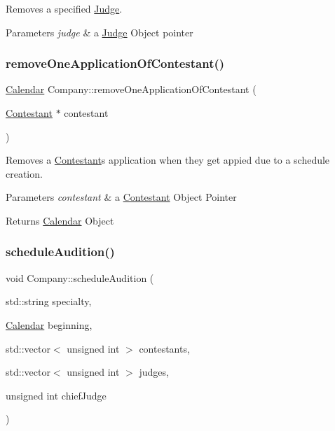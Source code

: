 Removes a specified \hyperlink{class_judge}{Judge}. 


\begin{DoxyParams}{Parameters}
{\em judge} & a \hyperlink{class_judge}{Judge} Object pointer \\
\hline
\end{DoxyParams}
\mbox{\label{class_company_a744e01f3f6644035f054ceb6827ddaa9}} 
\subsubsection{\texorpdfstring{remove\+One\+Application\+Of\+Contestant()}{removeOneApplicationOfContestant()}}
{\footnotesize\ttfamily \hyperlink{class_calendar}{Calendar} Company\+::remove\+One\+Application\+Of\+Contestant (\begin{DoxyParamCaption}\item[{\hyperlink{class_contestant}{Contestant} $\ast$}]{contestant }\end{DoxyParamCaption})}



Removes a \hyperlink{class_contestant}{Contestant}\textquotesingle{}s application when they get appied due to a schedule creation. 


\begin{DoxyParams}{Parameters}
{\em contestant} & a \hyperlink{class_contestant}{Contestant} Object Pointer \\
\hline
\end{DoxyParams}
\begin{DoxyReturn}{Returns}
\hyperlink{class_calendar}{Calendar} Object 
\end{DoxyReturn}
\mbox{\label{class_company_ae5763c1da591cd2fcee8715990869fbd}} 
\subsubsection{\texorpdfstring{schedule\+Audition()}{scheduleAudition()}}
{\footnotesize\ttfamily void Company\+::schedule\+Audition (\begin{DoxyParamCaption}\item[{std\+::string}]{specialty,  }\item[{\hyperlink{class_calendar}{Calendar}}]{beginning,  }\item[{std\+::vector$<$ unsigned int $>$}]{contestants,  }\item[{std\+::vector$<$ unsigned int $>$}]{judges,  }\item[{unsigned int}]{chief\+Judge }\end{DoxyParamCaption})}



